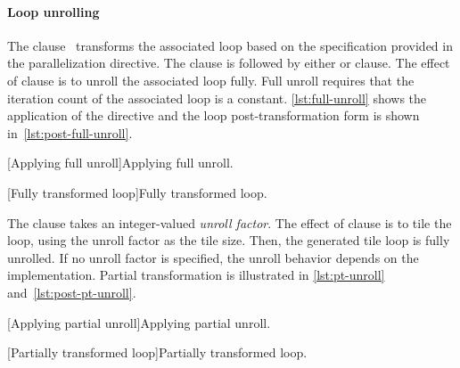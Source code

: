 \paragraph*{Loop unrolling}
The  clause~\cite[p. 381--382]{openmp_api}
transforms the associated loop based on the specification provided in the parallelization directive.
The  clause is followed by either  or  clause.
The effect of  clause is to unroll the associated loop fully.
Full unroll requires that the iteration count of the associated loop is a constant.
\autoref{lst:full-unroll} shows the application of the directive and the loop post-transformation form is shown in~\autoref{lst:post-full-unroll}.

\begin{center}
\begin{minipage}{\textwidth}
\captionsetup{type=lstlisting}
\begin{minipage}{.45\textwidth}
[Applying full unroll]{Applying full unroll.}
\label{lst:full-unroll}
\end{minipage}\hfill%
\begin{minipage}{.45\textwidth}
[Fully transformed loop]{Fully transformed loop.}
\label{lst:post-full-unroll}
\end{minipage}
\end{minipage}
\end{center}

The  clause takes an integer-valued \emph{unroll factor}.
The effect of  clause is to tile the loop, using the unroll factor as the tile size.
Then, the generated tile loop is fully unrolled.
If no unroll factor is specified, the unroll behavior depends on the implementation.
Partial transformation is illustrated in \autoref{lst:pt-unroll} and~\autoref{lst:post-pt-unroll}.

\begin{center}
\begin{minipage}{\textwidth}
\captionsetup{type=lstlisting}
\begin{minipage}{.45\textwidth}
[Applying partial unroll]{Applying partial unroll.}
\label{lst:pt-unroll}
\end{minipage}\hfill%
\begin{minipage}{.45\textwidth}
[Partially transformed loop]{Partially transformed loop.}
\label{lst:post-pt-unroll}
\end{minipage}
\end{minipage}
\end{center}


